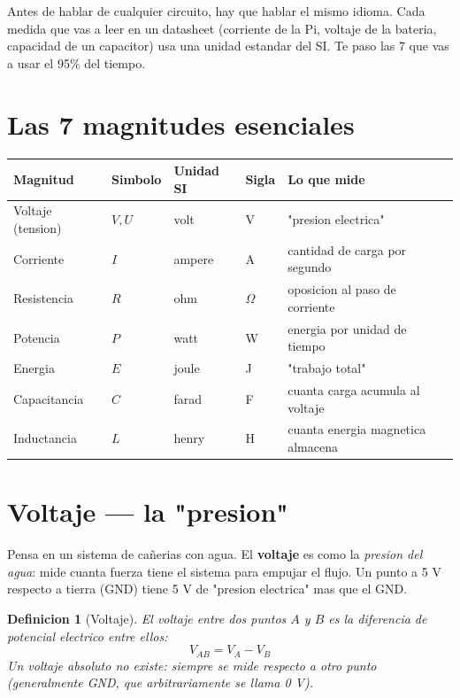 \documentclass[11pt,a4paper,oneside,openright]{book}
\newtheorem{definicion}{Definicion}[chapter]
\begin{document}
Antes de hablar de cualquier circuito, hay que hablar el mismo idioma. Cada
medida que vas a leer en un datasheet (corriente de la Pi, voltaje de la
bateria, capacidad de un capacitor) usa una unidad estandar del SI. Te paso
las 7 que vas a usar el 95\% del tiempo.

\section{Las 7 magnitudes esenciales}

\begin{center}
\begin{tabular}{lllll}
\toprule
\textbf{Magnitud} & \textbf{Simbolo} & \textbf{Unidad SI} & \textbf{Sigla} & \textbf{Lo que mide} \\
\midrule
Voltaje (tension)   & $V, U$ & volt     & V    & "presion electrica" \\
Corriente            & $I$    & ampere   & A    & cantidad de carga por segundo \\
Resistencia          & $R$    & ohm      & $\Omega$ & oposicion al paso de corriente \\
Potencia             & $P$    & watt     & W    & energia por unidad de tiempo \\
Energia              & $E$    & joule    & J    & "trabajo total" \\
Capacitancia         & $C$    & farad    & F    & cuanta carga acumula al voltaje \\
Inductancia          & $L$    & henry    & H    & cuanta energia magnetica almacena \\
\bottomrule
\end{tabular}
\end{center}

\section{Voltaje --- la "presion"}

\begin{intuibox}
Pensa en un sistema de cañerias con agua. El \textbf{voltaje} es como la
\emph{presion del agua}: mide cuanta fuerza tiene el sistema para empujar
el flujo. Un punto a 5 V respecto a tierra (GND) tiene 5 V de "presion
electrica" mas que el GND.
\end{intuibox}

\begin{definicion}[Voltaje]
El voltaje entre dos puntos $A$ y $B$ es la diferencia de potencial
electrico entre ellos:
\begin{equation}
V_{AB} = V_A - V_B
\end{equation}
Un voltaje absoluto no existe: siempre se mide \emph{respecto a otro punto}
(generalmente GND, que arbitrariamente se llama 0 V).
\end{definicion}
\end{document}
